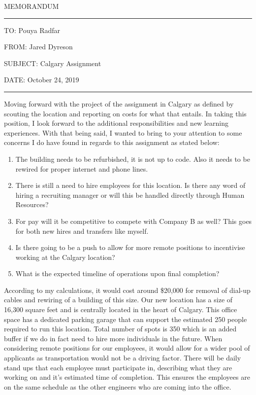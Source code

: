 \documentclass{article}
\begin{document}
\doublespacing

\begin{center}
MEMORANDUM
\end{center}

\par\noindent\rule{\textwidth}{0.4pt}

\begin{flushleft}
TO: Pouya Radfar

FROM: Jared Dyreson

SUBJECT: Calgary Assignment

DATE: October 24, 2019
\end{flushleft}

\par\noindent\rule{\textwidth}{0.4pt}

Moving forward with the project of the assignment in Calgary as defined by scouting the location and reporting on costs for what that entails. 
In taking this position, I look forward to the additional responsibilities and new learning experiences.
With that being said, I wanted to bring to your attention to some concerns I do have found in regards to this assignment as stated below: 

\begin{enumerate}
\item The building needs to be refurbished, it is not up to code. Also it needs to be rewired for proper internet and phone lines.
\item There is still a need to hire employees for this location. Is there any word of hiring a recruiting manager or will this be handled directly through Human Resources?
\item For pay will it be competitive to compete with Company B as well? This goes for both new hires and transfers like myself.
\item Is there going to be a push to allow for more remote positions to incentivise working at the Calgary location?
\item What is the expected timeline of operations upon final completion?
\end{enumerate}

According to my calculations, it would cost around \$20,000 for removal of dial-up cables and rewiring of a building of this size.
Our new location has a size of 16,300 square feet and is centrally located in the heart of Calgary.
This office space has a dedicated parking garage that can support the estimated 250 people required to run this location.
Total number of spots is 350 which is an added buffer if we do in fact need to hire more individuals in the future.
When considering remote positions for our employees, it would allow for a wider pool of applicants as transportation would not be a driving factor.
There will be daily stand ups that each employee must participate in, describing what they are working on and it's estimated time of completion.
This ensures the employees are on the same schedule as the other engineers who are coming into the office.
\end{document}
